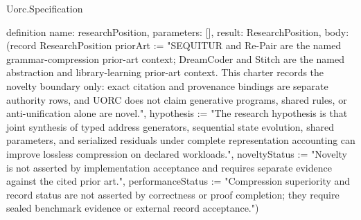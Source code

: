 \begin{lexlean}{Uorc.Specification}
\begin{semanticmodule}
definition{
  name: researchPosition,
  parameters: [],
  result: ResearchPosition,
  body: (record ResearchPosition {priorArt := "SEQUITUR and Re-Pair are the named grammar-compression prior-art context; DreamCoder and Stitch are the named abstraction and library-learning prior-art context. This charter records the novelty boundary only: exact citation and provenance bindings are separate authority rows, and UORC does not claim generative programs, shared rules, or anti-unification alone are novel.", hypothesis := "The research hypothesis is that joint synthesis of typed address generators, sequential state evolution, shared parameters, and serialized residuals under complete representation accounting can improve lossless compression on declared workloads.", noveltyStatus := "Novelty is not asserted by implementation acceptance and requires separate evidence against the cited prior art.", performanceStatus := "Compression superiority and record status are not asserted by correctness or proof completion; they require sealed benchmark evidence or external record acceptance."})
}
\end{semanticmodule}
\end{lexlean}
